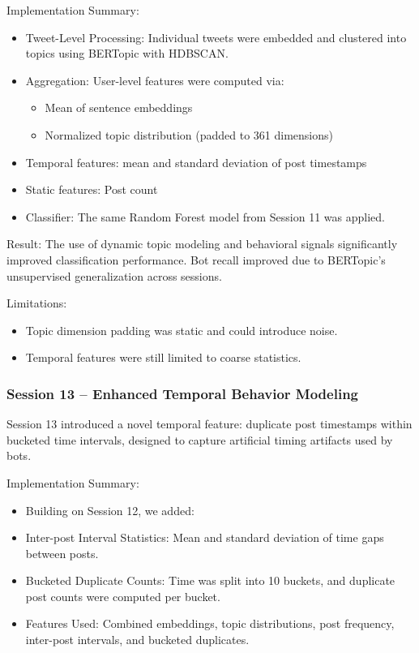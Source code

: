\documentclass[conference]{IEEEtran}
\begin{document}
Implementation Summary:
\begin{itemize}
    \item Tweet-Level Processing: Individual tweets were embedded and clustered into topics using BERTopic with HDBSCAN.
    
    \item Aggregation: User-level features were computed via:
    \begin{itemize}
        \item  Mean of sentence embeddings
        
        \item Normalized topic distribution (padded to 361 dimensions)
    \end{itemize}
    
    \item Temporal features: mean and standard deviation of post timestamps
    
    \item Static features: Post count
    
    \item Classifier: The same Random Forest model from Session 11 was applied.
\end{itemize}


Result:
The use of dynamic topic modeling and behavioral signals significantly improved classification performance. Bot recall improved due to BERTopic's unsupervised generalization across sessions.

Limitations:
\begin{itemize}
    \item Topic dimension padding was static and could introduce noise.
    
    \item Temporal features were still limited to coarse statistics.
\end{itemize}

\subsubsection{Session 13 – Enhanced Temporal Behavior Modeling}
Session 13 introduced a novel temporal feature: duplicate post timestamps within bucketed time intervals, designed to capture artificial timing artifacts used by bots.

Implementation Summary:
\begin{itemize}
    \item Building on Session 12, we added:
    
    \item Inter-post Interval Statistics: Mean and standard deviation of time gaps between posts.
    
    \item Bucketed Duplicate Counts: Time was split into 10 buckets, and duplicate post counts were computed per bucket.
    
    \item Features Used: Combined embeddings, topic distributions, post frequency, inter-post intervals, and bucketed duplicates.
\end{itemize}
    
\end{document}
